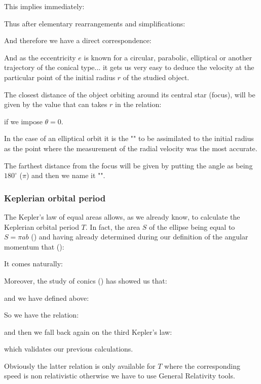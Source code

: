 	This implies immediately:
	
	Thus after elementary rearrangements and simplifications:
	
	And therefore we have a direct correspondence:
	
	And as the eccentricity $e$ is known for a circular, parabolic, elliptical or another trajectory of the conical type... it gets us very easy to deduce the velocity at the particular point of the initial radius $r$ of the studied object.

	The closest distance of the object orbiting around its central star (focus), will be given by the value that can takes $r$ in the relation:
	
	if we impose $\theta=0$.

	In the case of an elliptical orbit it is the "" to be assimilated to the initial radius as the point where the measurement of the radial velocity was the most accurate.

	The farthest distance from the focus will be given by putting the angle as being $180^\circ$ ($\pi$) and then we name it "".
	
	\pagebreak
	\subsubsection{Keplerian orbital period}
	The Kepler's law of equal areas allows, as we already know, to calculate the Keplerian orbital period $T$. In fact, the area $S$ of the ellipse being equal to $S=\pi a b$ () and having already determined during our definition of the angular momentum that ():
	 
	It comes naturally:
	
	Moreover, the study of conics () has showed us that:
	
	and we have defined above:
	
	So we have the relation:
	
	and then we fall back again on the third Kepler's law:
	
	which validates our previous calculations.
	
	Obviously the latter relation is only available for $T$ where the corresponding speed is non relativistic otherwise we have to use General Relativity tools.
	
